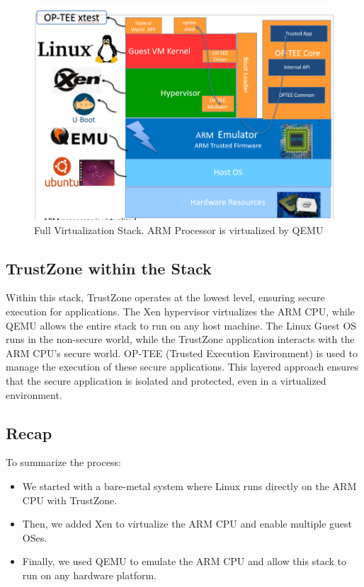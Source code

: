 \documentclass[acmtog]{acmart}
\begin{document}
\begin{figure}[ht]
  \centering
  \includegraphics[width=\columnwidth]{images/optee_virtual_arch.png}
  \caption{Full Virtualization Stack. ARM Processor is virtualized by QEMU}
  \label{fig:image_label}
\end{figure}

\subsection{TrustZone within the Stack}
Within this stack, TrustZone operates at the lowest level, ensuring secure execution for applications. The Xen hypervisor virtualizes the ARM CPU, while QEMU allows the entire stack to run on any host machine. The Linux Guest OS runs in the non-secure world, while the TrustZone application interacts with the ARM CPU’s secure world. OP-TEE (Trusted Execution Environment) is used to manage the execution of these secure applications. This layered approach ensures that the secure application is isolated and protected, even in a virtualized environment.

\subsection{Recap}
To summarize the process:
\begin{itemize}
    \item We started with a bare-metal system where Linux runs directly on the ARM CPU with TrustZone.
    \item Then, we added Xen to virtualize the ARM CPU and enable multiple guest OSes.
    \item Finally, we used QEMU to emulate the ARM CPU and allow this stack to run on any hardware platform.
\end{itemize}
\end{document}
